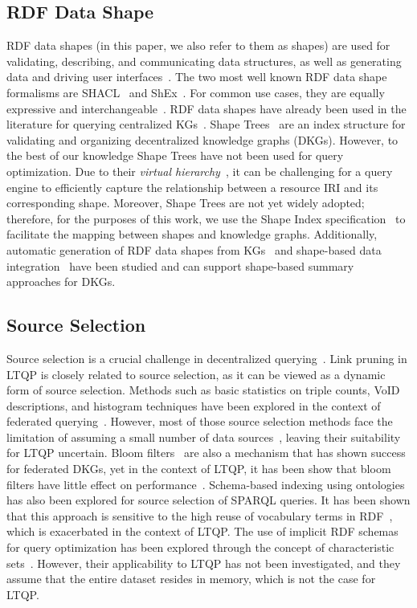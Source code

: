 \subsection{RDF Data Shape}
RDF data shapes (in this paper, we also refer to them as shapes) are used for validating, describing, and communicating data structures, as well as generating data and driving user interfaces~\cite{Gayo2018a,Gayo2018}.
The two most well known RDF data shape formalisms are SHACL~\cite{Gayo2018b} and ShEx~\cite{Gayo2018}.
For common use cases, they are equally expressive and interchangeable~\cite{Gayo2018c}.
RDF data shapes have already been used in the literature for querying centralized KGs~\cite{kashif2021, delva2023}.
Shape Trees~\cite{shapetreesShapeTrees} are an index structure for validating and organizing decentralized knowledge graphs (DKGs).
However, to the best of our knowledge Shape Trees have not been used for query optimization. 
Due to their \emph{virtual hierarchy}~\cite{shapetreesShapeTrees}, it can be challenging for a query engine to efficiently capture the relationship between a resource IRI and its corresponding shape. 
Moreover, Shape Trees are not yet widely adopted; therefore, for the purposes of this work, we use the Shape Index specification~\cite{tam2024opportunitiesshapebasedoptimizationlink} to facilitate the mapping between shapes and knowledge graphs. 
Additionally, automatic generation of RDF data shapes from KGs~\cite{fernandez2023extracting} and shape-based data integration~\cite{LabraGayo2023} have been studied and can support shape-based summary approaches for DKGs.

\subsection{Source Selection}
Source selection is a crucial challenge in decentralized querying~\cite{hose2012towards, Harth2010}. 
Link pruning in LTQP is closely related to source selection, as it can be viewed as a dynamic form of source selection.
Methods such as basic statistics on triple counts, VoID descriptions, and histogram techniques have been explored in the context of federated querying~\cite{hose2012towards, Harth2010, Montoya2017}.
However, most of those source selection methods face the limitation of assuming a small number of data sources~\cite{Harth2010}, leaving their suitability for LTQP uncertain.
Bloom filters~\cite{dia2018fast} are also a mechanism that has shown success for federated DKGs, yet in the context of LTQP, it has been show that bloom filters have little effect on performance~\cite{Hanski2024}.
Schema-based indexing using ontologies~\cite{Stuckenschmidt2004} has also been explored for source selection of SPARQL queries.
It has been shown that this approach is sensitive to the high reuse of vocabulary terms in RDF~\cite{Harth2010}, which is exacerbated in the context of LTQP.
The use of implicit RDF schemas for query optimization has been explored through the concept of characteristic sets~\cite{Neumann2011CharacteristicSA, Meimaris2017ExtendedCS, Montoya2017}. 
However, their applicability to LTQP has not been investigated, and they assume that the entire dataset resides in memory, which is not the case for LTQP.
